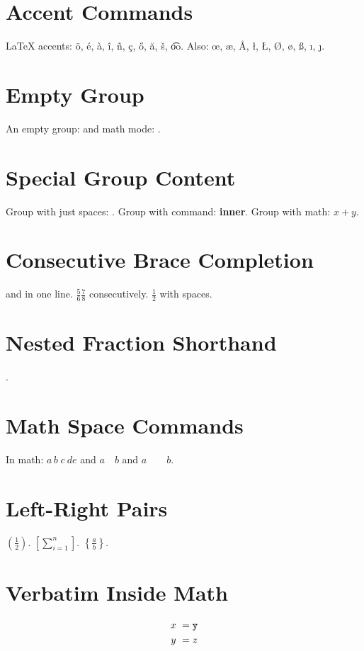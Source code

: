 \documentclass{article}
\begin{document}
\section{Accent Commands}
LaTeX accents: \"{o}, \'{e}, \`{a}, \^{i}, \~{n}, \c{c}, \H{o}, \u{a}, \v{s}, \t{oo}.
Also: \oe, \ae, \AA, \l, \L, \O, \o, \ss, \i, \j.

\section{Empty Group}
An empty group: {} and math mode: ${}$.

\section{Special Group Content}
Group with just spaces: {   }.
Group with command: {\textbf{inner}}.
Group with math: {$x + y$}.

\section{Consecutive Brace Completion}
 and  in one line.
$\frac56\frac78$ consecutively.
$\frac 1 2$ with spaces.

\section{Nested Fraction Shorthand}
.

\section{Math Space Commands}
In math: $a\,b\;c\:d\!e$ and $a\quad b$ and $a\qquad b$.

\section{Left-Right Pairs}
$\left( \frac{1}{2} \right)$.
$\left[ \sum_{i=1}^{n} \right]$.
$\left\{ \frac{a}{b} \right\}$.

\section{Verbatim Inside Math}
\begin{align}
x \ &= \verb|y| \\
y \ &= z
\end{align}
\end{document}
